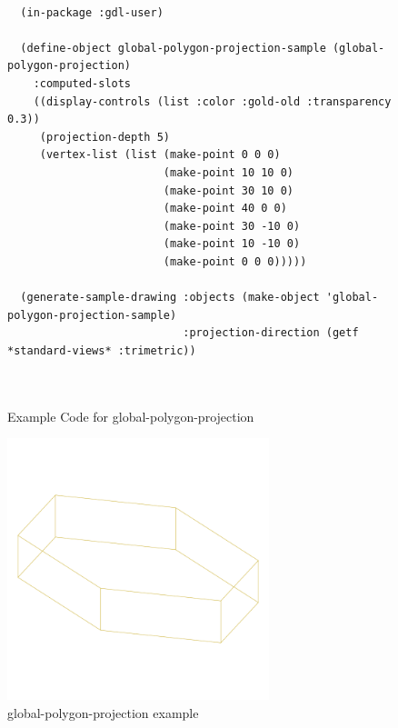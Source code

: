 \documentclass [11pt]{book}
\begin{document}
\begin{itemize}
\begin{figure}
\begin{lrbox}{\boxedverb}
\begin{minipage}{\linewidth}
{\begin{verbatim}

  (in-package :gdl-user)

  (define-object global-polygon-projection-sample (global-polygon-projection)
    :computed-slots
    ((display-controls (list :color :gold-old :transparency 0.3))
     (projection-depth 5)
     (vertex-list (list (make-point 0 0 0)
                        (make-point 10 10 0)
                        (make-point 30 10 0)
                        (make-point 40 0 0)
                        (make-point 30 -10 0)
                        (make-point 10 -10 0)
                        (make-point 0 0 0)))))

  (generate-sample-drawing :objects (make-object 'global-polygon-projection-sample)
                           :projection-direction (getf *standard-views* :trimetric))  

  
\end{verbatim}}
\end{minipage}
\end{lrbox}
\fbox{\usebox{\boxedverb}}

\caption{Example Code for global-polygon-projection}

\label{fig:example-code-global-polygon-projection}

\end{figure}

\begin{figure}
\begin{center}
\includegraphics[width=3in,height=3in]{../images/example-global-polygon-projection.pdf}
\end{center}

\caption{global-polygon-projection example}

\label{fig:global-polygon-projection}


\end{figure}
\end{itemize}
\end{document}
